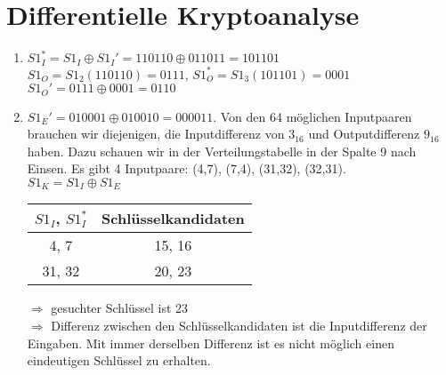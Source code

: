 \documentclass{article}
\begin{document}
	\section*{Differentielle Kryptoanalyse}
	\begin{enumerate}[label=(\alph*)]
		\item $S1_I^\ast = S1_I \oplus S1_I' = 110110 \oplus 011011 = 101101$ \\
		$S1_O = S1_2(110110) = 0111$, $S1_O^\ast = S1_3(101101) = 0001$ \\
		$S1_O' = 0111 \oplus 0001 = 0110$
		\item $S1_E' = 010001 \oplus 010010 = 000011$. Von den 64 möglichen Inputpaaren brauchen wir diejenigen, die Inputdifferenz von $3_{16}$ und Outputdifferenz $9_{16}$ haben. Dazu schauen wir in der Verteilungstabelle in der Spalte 9 nach Einsen. Es gibt 4 Inputpaare: (4,7), (7,4), (31,32), (32,31). \\
		$S1_K = S1_I \oplus S1_E$
		\begin{center}
			\begin{tabular}{c|c}
				$S1_I$, $S1_I^\ast$ & Schlüsselkandidaten \\
				\hline
				4, 7 & 15, 16 \\
				31, 32 & 20, 23
			\end{tabular}
		\end{center}
		$\Rightarrow$ gesuchter Schlüssel ist 23 \\
		$\Rightarrow$ Differenz zwischen den Schlüsselkandidaten ist die Inputdifferenz der Eingaben. Mit immer derselben Differenz ist es nicht möglich einen eindeutigen Schlüssel zu erhalten.
	\end{enumerate}
\end{document}
